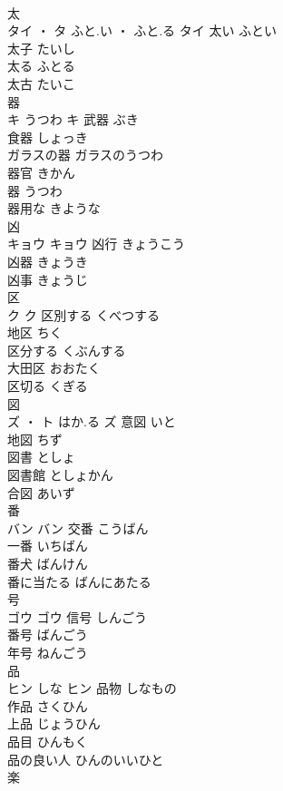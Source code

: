 \documentclass[8pt]{extreport}
\begin{document}
\begin{CJK}{UTF8}{min}
\\	太	
\\	タイ ・ タ	ふと.い ・ ふと.る	タイ	太い	ふとい	
\\	太子	たいし	
\\	太る	ふとる	
\\	太古	たいこ	
\\	器	
\\	キ	うつわ	キ	武器	ぶき	
\\	食器	しょっき	
\\	ガラスの器	ガラスのうつわ	
\\	器官	きかん	
\\	器	うつわ	
\\	器用な	きような	
\\	凶	
\\	キョウ		キョウ	凶行	きょうこう	
\\	凶器	きょうき	
\\	凶事	きょうじ	
\\	区	
\\	ク		ク	区別する	くべつする	
\\	地区	ちく	
\\	区分する	くぶんする	
\\	大田区	おおたく	
\\	区切る	くぎる	
\\	図	
\\	ズ ・ ト	はか.る	ズ	意図	いと	
\\	地図	ちず	
\\	図書	としょ	
\\	図書館	としょかん	
\\	合図	あいず	
\\	番	
\\	バン		バン	交番	こうばん	
\\	一番	いちばん	
\\	番犬	ばんけん	
\\	番に当たる	ばんにあたる	
\\	号	
\\	ゴウ		ゴウ	信号	しんごう	
\\	番号	ばんごう	
\\	年号	ねんごう	
\\	品	
\\	ヒン	しな	ヒン	品物	しなもの	
\\	作品	さくひん	
\\	上品	じょうひん	
\\	品目	ひんもく	
\\	品の良い人	ひんのいいひと	
\\	楽	

\end{CJK}
\end{document}
